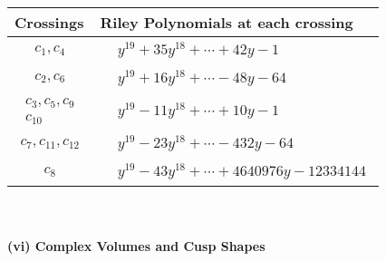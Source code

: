 \documentclass[1p]{elsarticle_modified}
\theoremstyle{definition}
\begin{document}
\begin{tabular}{m{50pt}|m{274pt}}
Crossings & \hspace{64pt}Riley Polynomials at each crossing \\
\hline $$\begin{aligned}c_{1},c_{4}\end{aligned}$$&$\begin{aligned}
&y^{19}+35 y^{18}+\cdots+42 y-1
\end{aligned}$\\
\hline $$\begin{aligned}c_{2},c_{6}\end{aligned}$$&$\begin{aligned}
&y^{19}+16 y^{18}+\cdots-48 y-64
\end{aligned}$\\
\hline $$\begin{aligned}c_{3},c_{5},c_{9}\\c_{10}\end{aligned}$$&$\begin{aligned}
&y^{19}-11 y^{18}+\cdots+10 y-1
\end{aligned}$\\
\hline $$\begin{aligned}c_{7},c_{11},c_{12}\end{aligned}$$&$\begin{aligned}
&y^{19}-23 y^{18}+\cdots-432 y-64
\end{aligned}$\\
\hline $$\begin{aligned}c_{8}\end{aligned}$$&$\begin{aligned}
&y^{19}-43 y^{18}+\cdots+4640976 y-12334144
\end{aligned}$\\
\hline
\end{tabular}\\~\\
\newpage\flushleft \textbf{(vi) Complex Volumes and Cusp Shapes}
\end{document}
